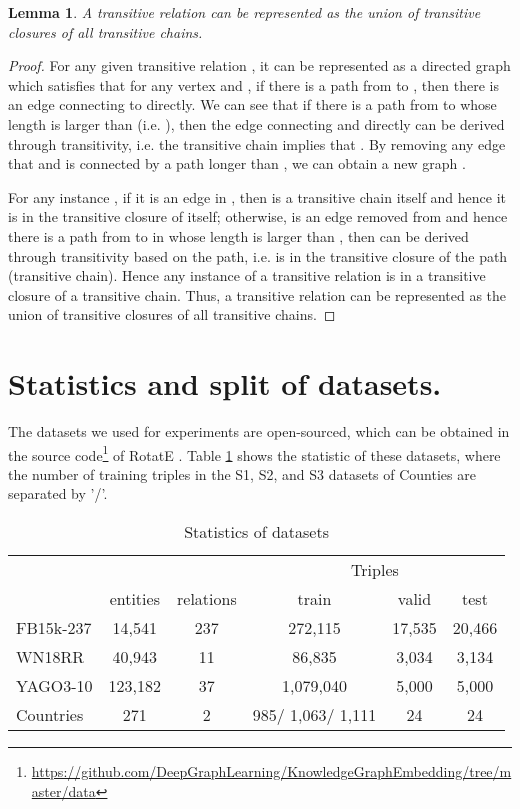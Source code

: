 \documentclass{article}
\newtheorem{lemma}{Lemma}
\begin{document}
\begin{lemma}
\label{app:lemma}
A transitive relation can be represented as the union of transitive closures of all transitive chains.
\end{lemma}
\begin{proof}
For any given transitive relation , it can be represented as a directed graph  which satisfies that for any vertex  and , if there is a path from  to , then there is an edge connecting  to  directly.
We can see that if there is a path  from  to  whose length is larger than  (i.e. ), then the edge connecting  and  directly can be derived through transitivity, i.e. the transitive chain  implies that .
By removing any edge  that  and  is connected by a path longer than , we can obtain a new graph .

For any instance , if it is an edge in , then  is a transitive chain itself and hence it is in the transitive closure of itself; otherwise,  is an edge removed from  and hence there is a path from  to  in  whose length is larger than , then  can be derived through transitivity based on the path, i.e.  is in the transitive closure of the path (transitive chain). Hence any instance of a transitive relation is in a transitive closure of a transitive chain. Thus, a transitive relation can be represented as the union of transitive closures of all transitive chains.
\end{proof}



\section{Statistics and split of datasets.}
The datasets we used for experiments are open-sourced, which can be obtained in the source code\footnote{\url{https://github.com/DeepGraphLearning/KnowledgeGraphEmbedding/tree/master/data}} of RotatE \cite{rotate}. Table \ref{stat_data_table} shows the statistic of these datasets, where the number of training triples in the S1, S2, and S3 datasets of Counties are separated by '/'.
\begin{table}[htb]
\caption{Statistics of datasets}
\label{stat_data_table}
  \centering
  \begin{tabular}{lccccc}
    \toprule
 &  & & \multicolumn{3}{c}{Triples}\\
  \cmidrule(lr{.75em}){4-6}
  & entities & relations & train & valid & test \\
    \midrule
    FB15k-237&
    14,541 & 237 & 272,115 & 17,535 & 20,466 \\
    WN18RR & 40,943 & 11 & 86,835 & 3,034 & 3,134
    \\
    YAGO3-10 &
    123,182	& 37 & 1,079,040 & 5,000 & 5,000\\
    Countries & 271 & 2 & 985/ 1,063/ 1,111 & 24 & 24\\
    \bottomrule
  \end{tabular}
\end{table}
\end{document}
